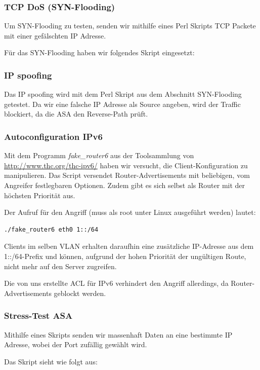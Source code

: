 \documentclass[11pt,a4paper,parskip=half]{scrartcl}
\begin{document}
\subsubsection{TCP DoS (SYN-Flooding)}
Um SYN-Flooding zu testen, senden wir mithilfe eines Perl Skripts TCP Packete mit einer gefälschten IP Adresse.

Für das SYN-Flooding haben wir folgendes Skript eingesetzt:


\subsubsection{IP spoofing}
Das IP spoofing wird mit dem Perl Skript aus dem Abschnitt SYN-Flooding getestet. Da wir eine falsche IP Adresse als Source angeben, wird der Traffic blockiert, da die ASA den Reverse-Path prüft.

\subsubsection{Autoconfiguration IPv6}
Mit dem Programm \emph{fake\_router6} aus der Toolsammlung von \url{http://www.thc.org/thc-ipv6/} haben wir versucht, die Client-Konfiguration zu manipulieren. Das Script versendet Router-Advertisements mit beliebigen, vom Angreifer festlegbaren Optionen. Zudem gibt es sich selbst als Router mit der höchsten Priorität aus.

Der Aufruf für den Angriff (muss als root unter Linux ausgeführt werden) lautet:
\begin{lstlisting}
./fake_router6 eth0 1::/64
\end{lstlisting}

Clients im selben VLAN erhalten daraufhin eine zusätzliche IP-Adresse aus dem 1::/64-Prefix und können, aufgrund der hohen Priorität der ungültigen Route, nicht mehr auf den Server zugreifen.

Die von uns erstellte ACL für IPv6 verhindert den Angriff allerdings, da Router-Advertisements geblockt werden.

\subsubsection{Stress-Test ASA}
Mithilfe eines Skripts senden wir massenhaft Daten an eine bestimmte IP Adresse, wobei der Port zufällig gewählt wird.

Das Skript sieht wie folgt aus:

\end{document}
